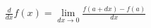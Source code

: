 \documentclass[preview]{standalone}
\begin{document}
\begin{align*}
\frac{d}{dx}f(x) = \lim_{dx \to 0} \frac{f(a+dx) - f(a)}{dx}
\end{align*}
\end{document}
